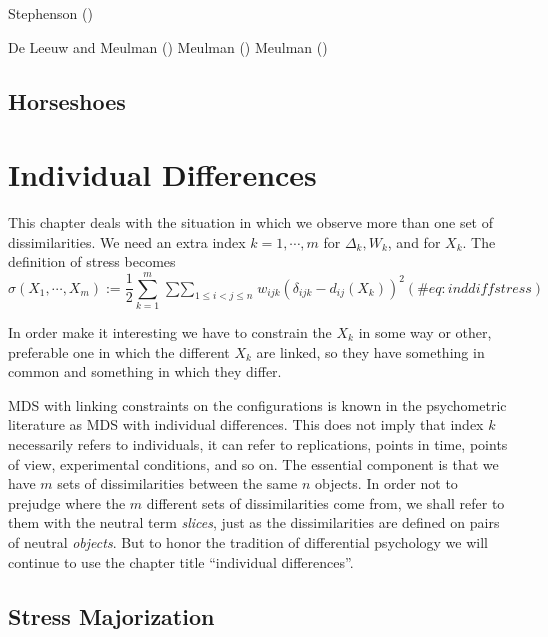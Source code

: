 \documentclass[
  12pt,
  letterpaper,
  DIV=11,
  numbers=noendperiod]{scrreprt}
\theoremstyle{remark}
\begin{document}
Stephenson ()

De Leeuw and Meulman () Meulman
() Meulman
()

\section{Horseshoes}\label{conshorseshoes}


\chapter{Individual Differences}\label{chindif}

This chapter deals with the situation in which we observe more than one
set of dissimilarities. We need an extra index \(k=1,\cdots,m\) for
\(\Delta_k, W_k\), and for \(X_k\). The definition of stress becomes
\begin{equation}
\sigma(X_1,\cdots,X_m):=\frac12\sum_{k=1}^m\mathop{\sum\sum}_{1\leq i<j\leq n}w_{ijk}(\delta_{ijk}-d_{ij}(X_k))^2
(\#eq:inddiffstress)
\end{equation}

In order make it interesting we have to constrain the \(X_k\) in some
way or other, preferable one in which the different \(X_k\) are linked,
so they have something in common and something in which they differ.

MDS with linking constraints on the configurations is known in the
psychometric literature as MDS with individual differences. This does
not imply that index \(k\) necessarily refers to individuals, it can
refer to replications, points in time, points of view, experimental
conditions, and so on. The essential component is that we have \(m\)
sets of dissimilarities between the same \(n\) objects. In order not to
prejudge where the \(m\) different sets of dissimilarities come from, we
shall refer to them with the neutral term \emph{slices}, just as the
dissimilarities are defined on pairs of neutral \emph{objects}. But to
honor the tradition of differential psychology we will continue to use
the chapter title ``individual differences''.

\section{Stress Majorization}\label{stress-majorization}
\end{document}
